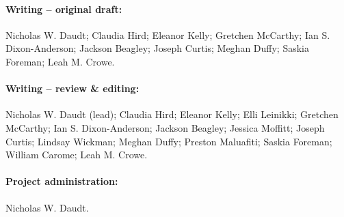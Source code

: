 \documentclass[10pt,letterpaper]{article}
\begin{document}
\paragraph*{Writing – original draft:} Nicholas W. Daudt; Claudia Hird; Eleanor Kelly; Gretchen McCarthy; Ian S. Dixon-Anderson; Jackson Beagley; Joseph Curtis; Meghan Duffy; Saskia Foreman; Leah M. Crowe.

\paragraph*{Writing – review & editing:} Nicholas W. Daudt (lead); Claudia Hird; Eleanor Kelly; Elli Leinikki; Gretchen McCarthy; Ian S. Dixon-Anderson; Jackson Beagley; Jessica Moffitt; Joseph Curtis; Lindsay Wickman; Meghan Duffy; Preston Maluafiti; Saskia Foreman; William Carome; Leah M. Crowe.

\paragraph*{Project administration:} Nicholas W. Daudt.

\nolinenumbers

%
%

%
%
%
%


\end{document}

